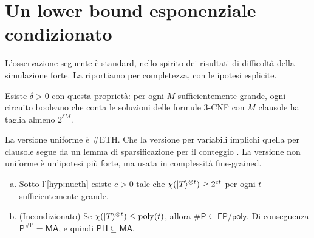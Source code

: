 \section{Un lower bound esponenziale condizionato}\label{sec:cond}

L'osservazione seguente è standard, nello spirito dei risultati di difficoltà della simulazione forte. La riportiamo per completezza, con le ipotesi esplicite.

\begin{hypothesis}\label{hyp:nueth}
Esiste $\delta>0$ con questa proprietà: per ogni $M$ sufficientemente grande, ogni circuito booleano che conta le soluzioni delle formule 3-CNF con $M$ clausole ha taglia almeno $2^{\delta M}$.
\end{hypothesis}

\noindent La versione uniforme è \#ETH. Che la versione per variabili implichi quella per clausole segue da un lemma di sparsificazione per il conteggio \cite{DHMTW14}. La versione non uniforme è un'ipotesi più forte, ma usata in complessità fine-grained.

\begin{proposition}\label{prop:cond}
\leavevmode
\begin{enumerate}[(a),leftmargin=2em]
\item Sotto l'\cref{hyp:nueth} esiste $c>0$ tale che $\chi(\lvert T\rangle^{\otimes t})\ge 2^{ct}$ per ogni $t$ sufficientemente grande.
\item (Incondizionato) Se $\chi(\lvert T\rangle^{\otimes t})\le\mathrm{poly}(t)$, allora $\#\mathsf P\subseteq\mathsf{FP/poly}$. Di conseguenza $\mathsf P^{\#\mathsf P}=\mathsf{MA}$, e quindi $\mathsf{PH}\subseteq\mathsf{MA}$.
\end{enumerate}
\end{proposition}

